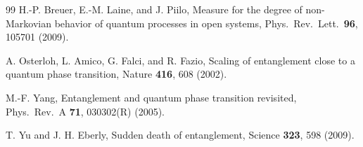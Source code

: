 \documentclass[aps,prb,twocolumn,superscriptaddress,longbibliography]{revtex4-2}
\begin{document}
\begin{thebibliography}{99}
H.-P. Breuer, E.-M. Laine, and J. Piilo, Measure for the degree of non-Markovian behavior of quantum processes in open systems, Phys.\ Rev.\ Lett.\ \textbf{96}, 105701 (2009).

A. Osterloh, L. Amico, G. Falci, and R. Fazio, Scaling of entanglement close to a quantum phase transition, Nature \textbf{416}, 608 (2002).

M.-F. Yang, Entanglement and quantum phase transition revisited, Phys.\ Rev.\ A \textbf{71}, 030302(R) (2005).

T. Yu and J. H. Eberly, Sudden death of entanglement, Science \textbf{323}, 598 (2009).

\end{thebibliography}
\end{document}
